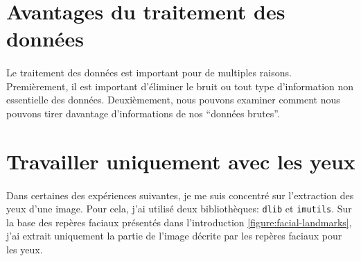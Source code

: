 \section{Avantages du traitement des données}
\paragraph{}
Le traitement des données est important pour de multiples raisons.
Premièrement, il est important d'éliminer le bruit ou tout type d'information non essentielle des données.
Deuxièmement, nous pouvons examiner comment nous pouvons tirer davantage d'informations de nos ``données brutes''.

\section{Travailler uniquement avec les yeux}
\label{data-processing:eyes}
\paragraph{}
Dans certaines des expériences suivantes, je me suis concentré sur l'extraction des yeux d'une image.
Pour cela, j'ai utilisé deux bibliothèques: \lstinline{dlib} et \lstinline{imutils}.
Sur la base des repères faciaux présentés dans l'introduction \ref{figure:facial-landmarks}, j'ai extrait uniquement la partie de l'image décrite par les repères faciaux pour les yeux.

